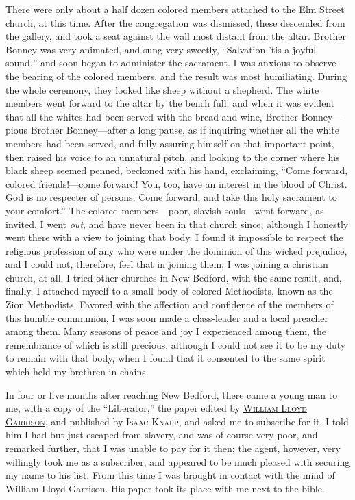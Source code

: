 There were only about a half dozen colored members attached to the Elm
Street church, at this time. After the congregation was dismissed, these
descended from the gallery, and took a seat against the wall most
distant from the altar. Brother Bonney was very animated, and sung very
sweetly, ``Salvation 'tis a joyful sound,'' and soon began to administer
the sacrament. I was anxious to observe the
{\protect\hypertarget{353}{}{}}bearing of the colored members, and the
result was most humiliating. During the whole ceremony, they looked like
sheep without a shepherd. The white members went forward to the altar by
the bench full; and when it was evident that all the whites had been
served with the bread and wine, Brother Bonney---pious Brother
Bonney---after a long pause, as if inquiring whether all the white
members had been served, and fully assuring himself on that important
point, then raised his voice to an unnatural pitch, and looking to the
corner where his black sheep seemed penned, beckoned with his hand,
exclaiming, ``Come forward, colored friends!---come forward! You, too,
have an interest in the blood of Christ. God is no respecter of persons.
Come forward, and take this holy sacrament to your comfort.'' The
colored members---poor, slavish souls---went forward, as invited. I went
\emph{out}, and have never been in that church since, although I
honestly went there with a view to joining that body. I found it
impossible to respect the religious profession of any who were under the
dominion of this wicked prejudice, and I could not, therefore, feel that
in joining them, I was joining a christian church, at all. I tried other
churches in New Bedford, with the same result, and, finally, I attached
myself to a small body of colored Methodists, known as the Zion
Methodists. Favored with the affection and confidence of the members of
this humble communion, I was soon made a class-leader and a local
preacher among them. Many seasons of peace and joy I experienced among
them, the remembrance of which is still precious, although
{\protect\hypertarget{354}{}{}}I could not see it to be my duty to
remain with that body, when I found that it consented to the same spirit
which held my brethren in chains.

In four or five months after reaching New Bedford, there came a young
man to me, with a copy of the ``Liberator,'' the paper edited by
\href{/wiki/Author:William_Lloyd_Garrison}{\textsc{William Lloyd
Garrison}}, and published by \textsc{Isaac Knapp}, and asked me to
subscribe for it. I told him I had but just escaped from slavery, and
was of course very poor, and remarked further, that I was unable to pay
for it then; the agent, however, very willingly took me as a subscriber,
and appeared to be much pleased with securing my name to his list. From
this time I was brought in contact with the mind of William Lloyd
Garrison. His paper took its place with me next to the bible.

